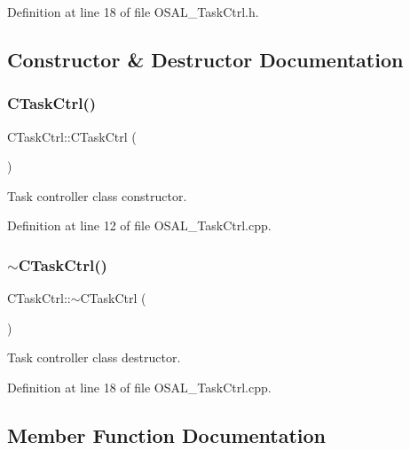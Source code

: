 Definition at line 18 of file O\+S\+A\+L\+\_\+\+Task\+Ctrl.\+h.



\subsection{Constructor \& Destructor Documentation}
\mbox{\label{class_c_task_ctrl_a4d459479b49c5d6e1d07e9306748abe3}} 
\subsubsection{\texorpdfstring{C\+Task\+Ctrl()}{CTaskCtrl()}}
{\footnotesize\ttfamily C\+Task\+Ctrl\+::\+C\+Task\+Ctrl (\begin{DoxyParamCaption}{ }\end{DoxyParamCaption})}



Task controller class constructor. 



Definition at line 12 of file O\+S\+A\+L\+\_\+\+Task\+Ctrl.\+cpp.

\mbox{\label{class_c_task_ctrl_a525a2b4438270d4ea5fce41e646c5b17}} 
\subsubsection{\texorpdfstring{$\sim$\+C\+Task\+Ctrl()}{~CTaskCtrl()}}
{\footnotesize\ttfamily C\+Task\+Ctrl\+::$\sim$\+C\+Task\+Ctrl (\begin{DoxyParamCaption}{ }\end{DoxyParamCaption})}



Task controller class destructor. 



Definition at line 18 of file O\+S\+A\+L\+\_\+\+Task\+Ctrl.\+cpp.



\subsection{Member Function Documentation}
\mbox{\label{class_c_task_ctrl_a12ec6e8d4a490eba9ebdf22d32cf292b}} 
